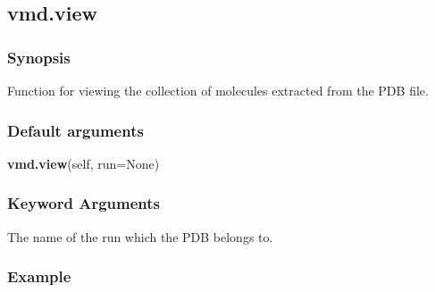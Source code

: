 \newpage

\subsection{vmd.view}


\subsubsection{Synopsis}

Function for viewing the collection of molecules extracted from the PDB file.

\subsubsection{Default arguments}

\textsf{\textbf{vmd.view}(self, run=None)}


\subsubsection{Keyword Arguments}

  The name of the run which the PDB belongs to.

\subsubsection{Example}



